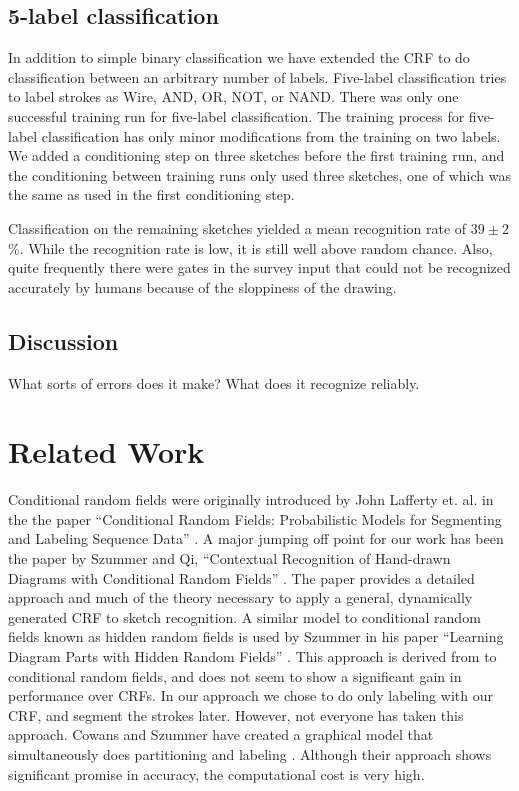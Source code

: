 \documentclass[10pt]{acmsiggraph}               %
\begin{document}
\subsection{5-label classification}

In addition to simple binary classification we have extended the CRF
to do classification between an arbitrary number of labels. Five-label
classification tries to label strokes as Wire, AND, OR, NOT, or NAND.
There was only one successful training run for five-label
classification.  The training process for five-label classification
has only minor modifications from the training on two labels.  We
added a conditioning step on three sketches before the first training
run, and the conditioning between training runs only used three
sketches, one of which was the same as used in the first conditioning
step.

Classification on the remaining sketches yielded a mean recognition rate of $39 \pm 2$\%.  While the recognition rate is low, it is still well above random chance.  Also, quite frequently there were gates in the survey input that could not be recognized accurately by humans because of the sloppiness of the drawing.  

\subsection{Discussion}

What sorts of errors does it make? What does it recognize reliably.

\section{Related Work}

Conditional random fields were originally introduced by John Lafferty et. al. in the the paper ``Conditional Random Fields: Probabilistic Models for Segmenting and Labeling Sequence Data'' \cite{lafferty01conditional}.	
A major jumping off point for our work has been the paper by Szummer and Qi, ``Contextual Recognition of Hand-drawn Diagrams with Conditional Random Fields'' \cite{szummer:CRFrecog}. The paper provides a detailed approach and much of the theory necessary to apply a general, dynamically generated CRF to sketch recognition.	
A similar model to conditional random fields known as hidden random fields is used by Szummer in his paper ``Learning Diagram Parts with Hidden Random Fields'' \cite{szummer:HRF}. This approach is derived from to conditional random fields, and does not seem to show a significant gain in performance over CRFs.
In our approach we chose to do only labeling with our CRF, and segment the strokes later. However, not everyone has taken this approach. Cowans and Szummer have created a graphical model that simultaneously does partitioning and labeling \cite{cowansSzummer}. Although their approach shows significant promise in accuracy, the computational cost is very high. 
\end{document}
